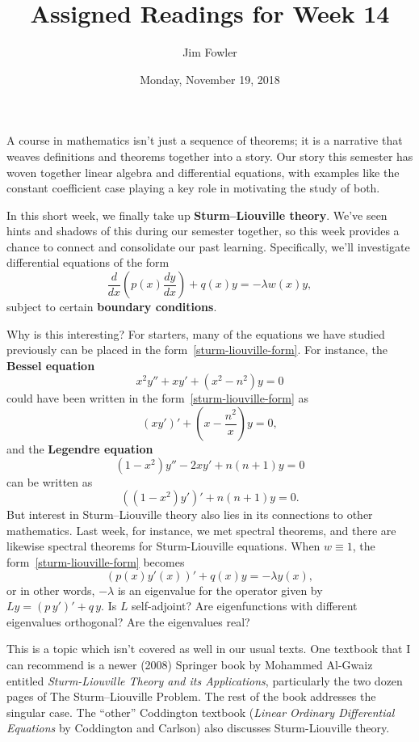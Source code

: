 \documentclass{homework}
\author{Jim Fowler}
\title{Assigned Readings for Week 14}
\date{Monday, November 19, 2018}
\begin{document}
\maketitle

A course in mathematics isn't just a sequence of theorems; it is a
narrative that weaves definitions and theorems together into a story.
Our story this semester has woven together linear algebra and
differential equations, with examples like the constant coefficient
case playing a key role in motivating the study of both.

In this short week, we finally take up \textbf{Sturm–Liouville
  theory}.  We've seen hints and shadows of this during our semester
together, so this week provides a chance to connect and consolidate
our past learning.  Specifically, we'll investigate differential equations of the form
\begin{equation*}\label{sturm-liouville-form}\tag{$*$}
{ {\frac {d }{d x}}\left( p(x){\frac { {d} y}{ {d} x}}\right)+q(x)y=-\lambda w(x)y,} \end{equation*}
subject to certain \textbf{boundary conditions}.

Why is this interesting?  For starters, many of the equations we have studied previously can be placed in the form~\eqref{sturm-liouville-form}.  For instance, the \textbf{Bessel equation}
\[  x^{2}y''+xy'+\left(x^{2}-n^{2}\right)y=0
\]
could have been written in the form~\eqref{sturm-liouville-form} as
\[
  {\displaystyle \left(xy'\right)'+\left(x-{\frac {n ^{2}}{x}}\right)y=0,}
\]
and the \textbf{Legendre equation}
\[
{\displaystyle \left(1-x^{2}\right)y''-2xy'+n (n +1)y=0}
\]
can be written as
\[
  {\displaystyle \left(\left(1-x^{2}\right)y'\right)'+n (n +1)y=0}.
\]
But interest in Sturm–Liouville theory also lies in its connections to other mathematics.  Last week, for instance, we met spectral theorems, and there are likewise spectral theorems for Sturm-Liouville equations.  When $w \equiv 1$, the form~\eqref{sturm-liouville-form} becomes
\[
  \left( p(x) y'(x) \right)'+q(x)y=-\lambda y(x),
\]
or in other words, $-\lambda$ is an eigenvalue for the operator given by $Ly = \left( p \, y' \right)'+q \, y$.  Is $L$ self-adjoint?  Are eigenfunctions with different eigenvalues orthogonal?  Are the eigenvalues real?  

This is a topic which isn't covered as well in our usual texts.  One
textbook that I can recommend is a newer (2008) Springer book by
Mohammed Al-Gwaiz entitled \textit{Sturm-Liouville Theory and its
  Applications}, particularly the two dozen pages of 
The Sturm–Liouville Problem.  The rest of the book addresses the
singular case.  The ``other'' Coddington textbook (\textit{Linear
  Ordinary Differential Equations} by Coddington and Carlson) also
discusses Sturm-Liouville theory.
\end{document}
